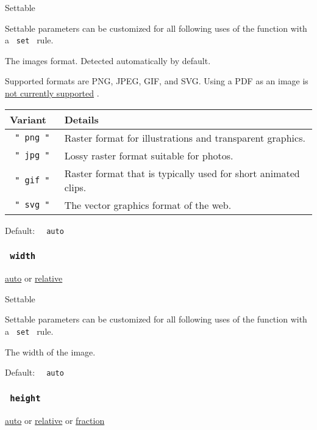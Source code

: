 {{ Settable }}

\label{parameters-format-settable-tooltip}
Settable parameters can be customized for all following uses of the
function with a \texttt{\ set\ } rule.

The image\textquotesingle s format. Detected automatically by default.

Supported formats are PNG, JPEG, GIF, and SVG. Using a PDF as an image
is \href{https://github.com/typst/typst/issues/145}{not currently
supported} .

\begin{longtable}[]{@{}ll@{}}
\toprule\noalign{}
Variant & Details \\
\midrule\noalign{}
\endhead
\bottomrule\noalign{}
\endlastfoot
\texttt{\ "\ png\ "\ } & Raster format for illustrations and transparent
graphics. \\
\texttt{\ "\ jpg\ "\ } & Lossy raster format suitable for photos. \\
\texttt{\ "\ gif\ "\ } & Raster format that is typically used for short
animated clips. \\
\texttt{\ "\ svg\ "\ } & The vector graphics format of the web. \\
\end{longtable}

Default: \texttt{\ }{\texttt{\ auto\ }}\texttt{\ }

\subsubsection{\texorpdfstring{\texttt{\ width\ }}{ width }}\label{parameters-width}

\href{/docs/reference/foundations/auto/}{auto} {or}
\href{/docs/reference/layout/relative/}{relative}

{{ Settable }}

\label{parameters-width-settable-tooltip}
Settable parameters can be customized for all following uses of the
function with a \texttt{\ set\ } rule.

The width of the image.

Default: \texttt{\ }{\texttt{\ auto\ }}\texttt{\ }

\subsubsection{\texorpdfstring{\texttt{\ height\ }}{ height }}\label{parameters-height}

\href{/docs/reference/foundations/auto/}{auto} {or}
\href{/docs/reference/layout/relative/}{relative} {or}
\href{/docs/reference/layout/fraction/}{fraction}

